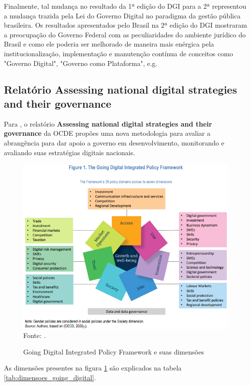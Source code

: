Finalmente, tal mudança no resultado da 1ª edição do DGI para a 2ª representou a mudança trazida pela Lei do Governo Digital no paradigma da gestão pública brasileira. Os resultados apresentados pelo Brasil na 2ª edição do DGI mostraram a preocupação do Governo Federal com as peculiaridades do ambiente jurídico do Brasil e como ele poderia ser melhorado de maneira mais enérgica pela institucionalização, implementação e manutenção contínua  de conceitos como "Governo Digital", "Governo como Plataforma", e.g.

\subsection{Relatório Assessing national digital strategies and their governance}

Para \cite{going_digital_2022}, o relatório \textbf{Assessing national digital strategies and their governance} da OCDE propões uma nova metodologia para avaliar a abrangência para dar apoio a governo em desenvolvimento, monitorando e avaliando suas estratégias digitais nacionais.

\begin{figure}[H]
	\centering
	\caption{Going Digital Integrated Policy Framework e suas dimensões}
	\includegraphics[width=1\linewidth]{figuras/going_digital_integrated_policy_framework}
	\label{fig:ocde_going_digital}
	\footnotesize{Fonte: \cite{going_digital_2022}.}
\end{figure}

As dimensões presentes na figura \ref{fig:ocde_going_digital} são explicados na tabela \ref{tab:dimensoes_going_digital}.

